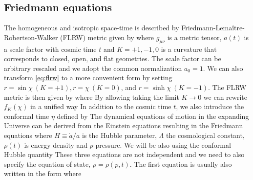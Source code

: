\subsection{Friedmann equations}
The homogeneous and isotropic space-time is described by Friedmann-Lema\^{i}tre-Robertson-Walker (FLRW) metric given by
where $g_{\mu\nu}$ is a metric tensor, $a(t)$ is a scale factor with cosmic time $t$ and $K=+1,-1,0$ is a curvature that corresponds to closed, open, and flat geometries. The scale factor can be arbitrary rescaled and we adopt the common normalization $a_0=1$. We can also transform \autoref{eq:flrw} to a more convenient form by setting $r=\sin\chi\ (K=+1),r=\chi\ (K=0)$, and $r=\sinh\chi\ (K=-1)$. The FLRW metric is then given by
where
By allowing taking the limit $K\to0$ we can rewrite $f_K(\chi)$ in a unified way
In addition to the cosmic time $t$, we also introduce the conformal time $\eta$ defined by
The dynamical equations of motion in the expanding Universe can be derived from the Einstein equations resulting in the Friedmann equations
where $H\equiv\dot a/a$ is the Hubble parameter, $\Lambda$ the cosmological constant, $\rho(t)$ is energy-density and $p$ pressure. We will be also using the conformal Hubble quantity
These three equations are not independent and we need to also specify the equation of state, $\rho=\rho(p,t)$. The first equation is usually also written in the form
where

